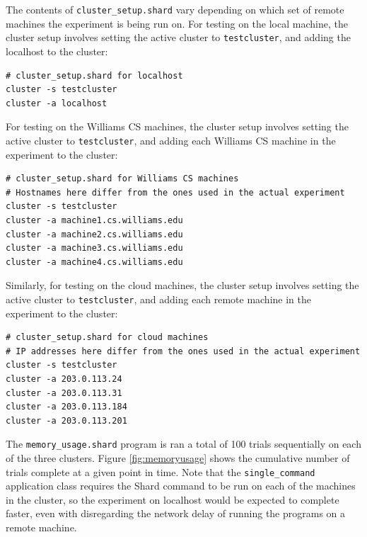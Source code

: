 \documentclass[twoside]{report}
\begin{document}
The contents of \texttt{cluster\_setup.shard} vary depending on which set of remote machines the experiment is being run on.
For testing on the local machine, the cluster setup involves setting the active cluster to \texttt{testcluster}, and adding the localhost to the cluster:

\begin{minipage}[c]{\textwidth-15pt}
  \begin{lstlisting}[language=Shard]
# cluster_setup.shard for localhost
cluster -s testcluster
cluster -a localhost
\end{lstlisting}
  \smallskip
\end{minipage}

For testing on the Williams CS machines, the cluster setup involves setting the active cluster to \texttt{testcluster}, and adding each Williams CS machine in the experiment to the cluster:

\begin{minipage}[c]{\textwidth-15pt}
  \begin{lstlisting}[language=Shard]
# cluster_setup.shard for Williams CS machines
# Hostnames here differ from the ones used in the actual experiment
cluster -s testcluster
cluster -a machine1.cs.williams.edu
cluster -a machine2.cs.williams.edu
cluster -a machine3.cs.williams.edu
cluster -a machine4.cs.williams.edu
\end{lstlisting}
  \smallskip
\end{minipage}

Similarly, for testing on the cloud machines, the cluster setup involves setting the active cluster to \texttt{testcluster}, and adding each remote machine in the experiment to the cluster:

\begin{minipage}[c]{\textwidth-15pt}
  \begin{lstlisting}[language=Shard]
# cluster_setup.shard for cloud machines
# IP addresses here differ from the ones used in the actual experiment
cluster -s testcluster
cluster -a 203.0.113.24
cluster -a 203.0.113.31
cluster -a 203.0.113.184
cluster -a 203.0.113.201
\end{lstlisting}
  \smallskip
\end{minipage}

The \texttt{memory\_usage.shard} program is ran a total of 100 trials sequentially on each of the three clusters.
Figure \ref{fig:memoryusage} shows the cumulative number of trials complete at a given point in time.
Note that the \texttt{single\_command} application class requires the Shard command to be run on each of the machines in the cluster, so the experiment on localhost would be expected to complete faster, even with disregarding the network delay of running the programs on a remote machine.
\end{document}
